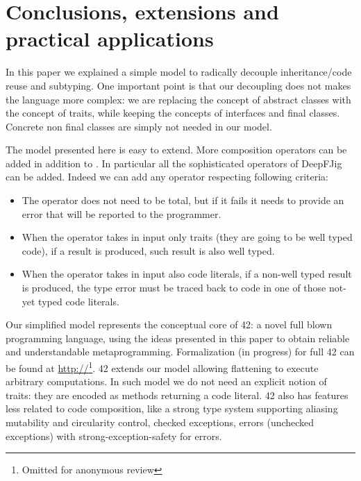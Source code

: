 \section{Conclusions, extensions and practical applications}

In this paper we explained a simple model to 
radically decouple inheritance/code reuse and subtyping.
One important point is that our decoupling does not
makes the language more complex:
we are replacing the concept of abstract classes with
the concept of traits, while keeping the concepts of
interfaces and final classes.
Concrete non final classes are simply not needed in our model.

The model presented here is easy to extend.
More composition operators can be added in addition to \use.
In particular all the sophisticated operators of DeepFJig can be added.
 Indeed we can add any operator respecting following criteria:

\begin{itemize}
\item The operator does not need to be total, but if it fails it needs to provide an error that will be reported to the programmer.
\item When the operator takes in input only traits (they are going to be well typed code), if a result is produced,
 such result is also well typed.
\item When the operator takes in input also code literals, if a non-well typed result is produced,
the type error must be traced back to code in one of those not-yet typed code literals.
 \end{itemize}
 

 
 Our simplified model represents the conceptual core of  42: a novel full blown programming language,
using the ideas presented in this paper to obtain reliable and understandable metaprogramming.
Formalization (in progress) for full 42 can be found at
\url{http://}\footnote{Omitted for anonymous review}. 
42 extends our model allowing
flattening to execute arbitrary computations.
In such model we do not need an explicit notion of traits: they are encoded as methods returning a code literal.
42 also has features less related to code composition, like
  a strong type system supporting aliasing mutability and circularity control,
   checked exceptions, errors (unchecked exceptions) with strong-exception-safety for errors.

\begin{comment}
42 do not have a finite set of composition operators; they can be
added using the built in support for native method calls. They can
be dynamically checked to verify that they are well behaved
according to our predicate, or they can be trusted to achieve
efficiency.
\end{comment}

